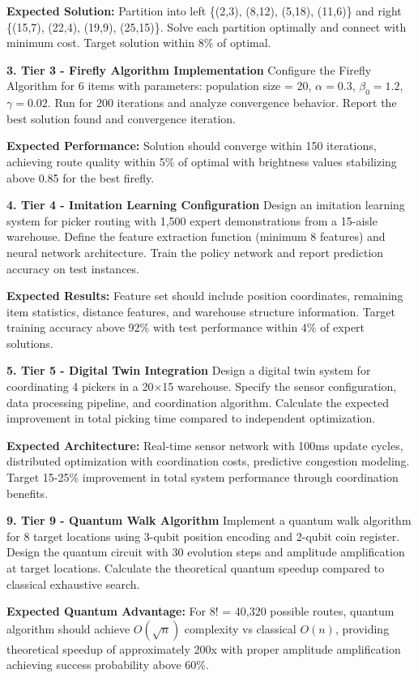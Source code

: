 \documentclass{article}
\begin{document}
\textbf{Expected Solution:} Partition into left \{(2,3), (8,12), (5,18), (11,6)\} and right \{(15,7), (22,4), (19,9), (25,15)\}. Solve each partition optimally and connect with minimum cost. Target solution within 8\% of optimal.

\textbf{3. Tier 3 - Firefly Algorithm Implementation}
Configure the Firefly Algorithm for 6 items with parameters: population size = 20, \( \alpha = 0.3 \), \( \beta_0 = 1.2 \), \( \gamma = 0.02 \). Run for 200 iterations and analyze convergence behavior. Report the best solution found and convergence iteration.

\textbf{Expected Performance:} Solution should converge within 150 iterations, achieving route quality within 5\% of optimal with brightness values stabilizing above 0.85 for the best firefly.

\textbf{4. Tier 4 - Imitation Learning Configuration}
Design an imitation learning system for picker routing with 1,500 expert demonstrations from a 15-aisle warehouse. Define the feature extraction function (minimum 8 features) and neural network architecture. Train the policy network and report prediction accuracy on test instances.

\textbf{Expected Results:} Feature set should include position coordinates, remaining item statistics, distance features, and warehouse structure information. Target training accuracy above 92\% with test performance within 4\% of expert solutions.

\textbf{5. Tier 5 - Digital Twin Integration}
Design a digital twin system for coordinating 4 pickers in a 20$\times$15 warehouse. Specify the sensor configuration, data processing pipeline, and coordination algorithm. Calculate the expected improvement in total picking time compared to independent optimization.

\textbf{Expected Architecture:} Real-time sensor network with 100ms update cycles, distributed optimization with coordination costs, predictive congestion modeling. Target 15-25\% improvement in total system performance through coordination benefits.

\textbf{9. Tier 9 - Quantum Walk Algorithm}
Implement a quantum walk algorithm for 8 target locations using 3-qubit position encoding and 2-qubit coin register. Design the quantum circuit with 30 evolution steps and amplitude amplification at target locations. Calculate the theoretical quantum speedup compared to classical exhaustive search.

\textbf{Expected Quantum Advantage:} For 8! = 40,320 possible routes, quantum algorithm should achieve \( O(\sqrt{n}) \) complexity vs classical \( O(n) \), providing theoretical speedup of approximately 200x with proper amplitude amplification achieving success probability above 60\%.
\end{document}
